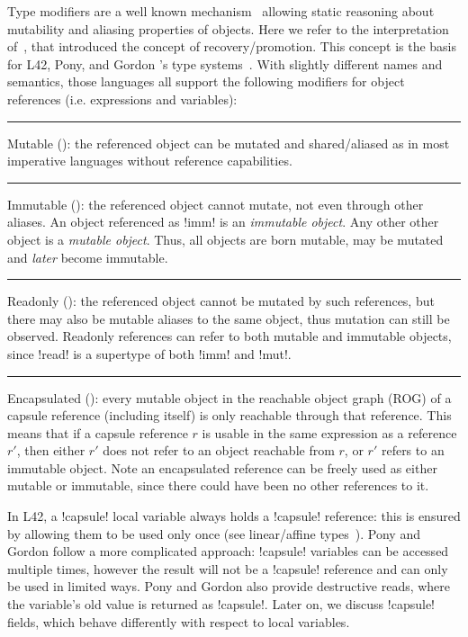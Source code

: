 Type modifiers
 are a well known mechanism~\cite{TschantzErnst05,BirkaErnst04,OstlundEtAl08,clebsch2015deny,GianniniEtAl16,GordonEtAl12}
 allowing static reasoning about mutability and aliasing properties of objects. Here we refer to the interpretation of~\cite{GordonEtAl12}, that introduced the concept of recovery/promotion. This concept is the basis for L42, Pony, and Gordon \etal's type systems~\cite{GordonEtAl12,ServettoEtAl13a,ServettoZucca15,clebsch2015deny,clebsch2017orca}. With slightly different names and semantics, those languages all support the following modifiers for object references (i.e. expressions and variables):

\noindent\rule{1.2ex}{1.2ex} Mutable (\Q@mut@): the referenced object can be mutated and shared/aliased as in most imperative languages without reference capabilities.

\noindent\rule{1.2ex}{1.2ex} Immutable (\Q@imm@): the referenced object cannot mutate, not even through other aliases. An object referenced as \Q!imm! is an \emph{immutable object}.
Any other other object is a \emph{mutable object}.
Thus, all objects are born mutable, may be mutated and \emph{later} become immutable.

\noindent\rule{1.2ex}{1.2ex} Readonly (\Q@read@): the referenced object cannot be mutated by such references, but there may also be mutable aliases to the same object, thus mutation can still be observed. Readonly references can refer to both mutable and immutable objects, since \Q!read! is a supertype of both \Q!imm! and \Q!mut!.

\noindent\rule{1.2ex}{1.2ex} Encapsulated (\Q@capsule@):
every mutable object in the reachable object graph (ROG) of a capsule reference (including itself) is only reachable through that reference. This means that if a capsule reference $r$ is usable in the same expression as a reference $r'$, then either $r'$ does not refer to an object reachable from $r$, or $r'$ refers to an immutable object. Note an encapsulated reference can be freely used as either mutable or immutable, since there could have been no other references to it.

In L42, a \Q!capsule! local variable always holds a \Q!capsule! reference: this is ensured by allowing them to be used only once (see linear/affine types~\cite{boyland2001alias}). 
Pony and Gordon \etal follow a more complicated approach: \Q!capsule! variables can be accessed multiple times, however the result will not be a \Q!capsule! reference and can only be used in limited ways. Pony and Gordon also provide destructive reads, where the variable's old value is returned as \Q!capsule!.
Later on, we discuss \Q!capsule! fields, which behave differently with respect to \Q@capsule@ local variables.


